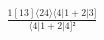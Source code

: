 \documentclass[varwidth, border=5pt]{standalone}
\begin{document}
\begin{my}
$\begin{gathered}
\scriptscriptstyle\frac{1[13]⟨24⟩⟨4|1+2|3]}{⟨4|1+2|4]²}
\end{gathered}$
\end{my}
\end{document}

